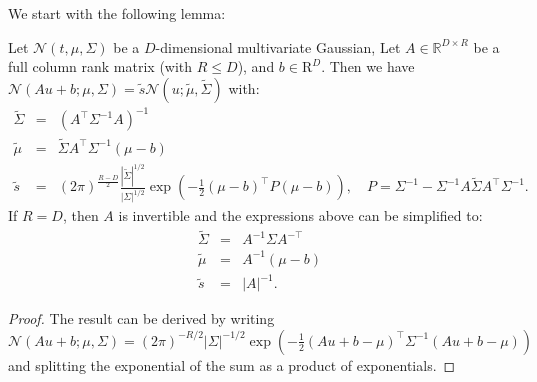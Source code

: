 \documentclass{article}
\begin{document}
We start with the following lemma:

\smallskip

\begin{lemma}\label{lemma:affine_transform_gaussian}
Let $\mathcal{N}(t, \mu, \Sigma)$ be a $D$-dimensional multivariate Gaussian, 
Let $A \in \mathbb{R}^{D \times R}$ be a full column rank matrix (with $R \le D$), and $b \in \mathrm{R}^D$. 
Then we have $\mathcal{N}(Au + b; \mu, \Sigma) = \tilde{s} \mathcal{N}(u; \tilde{\mu}, \tilde{\Sigma})$ with:
\begin{eqnarray*}
\tilde{\Sigma} &=& (A^\top \Sigma^{-1} A)^{-1}\\
\tilde{\mu} &=& \tilde{\Sigma}A^\top \Sigma^{-1} (\mu - b)\\
\tilde{s} &=& (2\pi)^{\frac{R-D}{2}} \frac{|\tilde{\Sigma}|^{1/2}}{|\Sigma|^{1/2}} \exp\left(-\frac{1}{2}(\mu-b)^\top P(\mu-b)\right), \quad P = \Sigma^{-1} - \Sigma^{-1} A \tilde{\Sigma} A^\top\Sigma^{-1}.
\end{eqnarray*}
If $R=D$, then $A$ is invertible and the expressions above can be simplified to:
\begin{eqnarray*}
\tilde{\Sigma} &=& A^{-1} \Sigma A^{-\top}\\
\tilde{\mu} &=& A^{-1} (\mu - b)\\
\tilde{s} &=& |A|^{-1}.
\end{eqnarray*}
\end{lemma}

\begin{proof}
The result can be derived by writing $\mathcal{N}(Au+b; \mu, \Sigma) = (2\pi)^{-R/2} |\Sigma|^{-1/2} \exp(-\tfrac{1}{2}(Au+b-\mu)^\top\Sigma^{-1}(Au+b-\mu))$ and splitting the exponential of the sum as a product of exponentials.
\end{proof}
\end{document}
